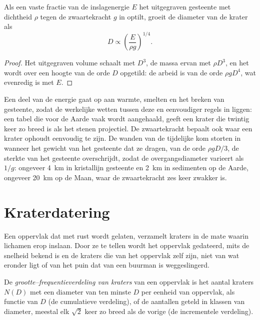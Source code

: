 \begin{proposition}\label{prop:b3:planetary-interiors-surfaces:scaling}
Als een vaste fractie van de inslagenergie $E$ het uitgegraven gesteente met
dichtheid $\rho$ tegen de zwaartekracht $g$ in optilt, groeit de diameter van de krater als
\[
  D \propto \left(\frac{E}{\rho g}\right)^{1/4} .
\]
\end{proposition}

\begin{proof}
Het uitgegraven volume schaalt met $D^3$, de massa ervan met $\rho D^3$, en het wordt
over een hoogte van de orde $D$ opgetild: de arbeid is van de orde $\rho g D^4$, wat
evenredig is met $E$.
\end{proof}

Een deel van de energie gaat op aan warmte, smelten en het breken van gesteente, zodat
de werkelijke wetten tussen deze en eenvoudiger regels in liggen: een tabel die voor de
Aarde vaak wordt aangehaald, geeft een krater die twintig keer zo breed is als het stenen
projectiel. De zwaartekracht bepaalt ook waar een krater ophoudt eenvoudig te zijn. De
wanden van de tijdelijke kom storten in wanneer het gewicht van het gesteente dat ze
dragen, van de orde $\rho g D/3$, de sterkte van het gesteente overschrijdt, zodat de
overgangsdiameter varieert als $1/g$: ongeveer \qty{4}{km} in kristallijn gesteente en
\qty{2}{km} in sedimenten op de Aarde, ongeveer \qty{20}{km} op de Maan, waar de
zwaartekracht zes keer zwakker is.

\section{Kraterdatering}\label{sec:b3:planetary-interiors-surfaces:dating}

Een oppervlak dat met rust wordt gelaten, verzamelt kraters in de mate waarin lichamen
erop inslaan. Door ze te tellen wordt het oppervlak gedateerd, mits de snelheid bekend
is en de kraters die van het oppervlak zelf zijn, niet van wat eronder ligt of van het
puin dat van een buurman is weggeslingerd.

\begin{definition}\label{def:b3:planetary-interiors-surfaces:sfd}
De \emph{grootte--frequentieverdeling van kraters}
van een oppervlak is het aantal kraters $N(D)$ met een diameter van ten minste $D$ per
eenheid van oppervlak, als functie van $D$ (de cumulatieve verdeling), of de aantallen
geteld in klassen van diameter, meestal elk $\sqrt2$ keer zo breed als de vorige (de
incrementele verdeling).
\end{definition}


